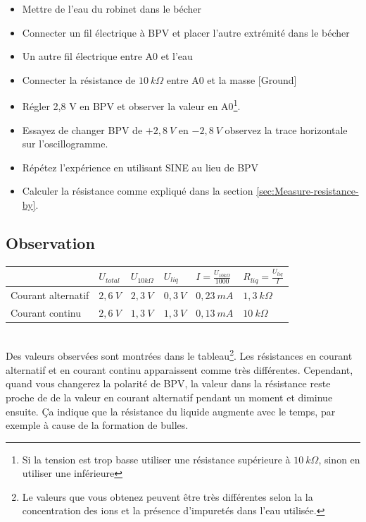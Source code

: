 \documentclass{book}
\begin{document}
\begin{itemize}
  \item Mettre de l'eau du robinet dans le bécher
  \item Connecter un fil électrique à BPV et placer l'autre extrémité dans le bécher
  \item Un autre fil électrique entre A0 et l'eau
  \item Connecter la résistance de $10\ k\Omega$  entre A0 et la masse [Ground]
  \item Régler 2,8 V en BPV et observer la valeur en A0\footnote{Si la tension est trop basse utiliser une résistance supérieure à $10\ k\Omega$, sinon en utiliser une inférieure}.
  \item Essayez de changer BPV de $+2,8\ V$ en $-2,8\ V$ observez la trace horizontale sur l'oscillogramme.
  \item Répétez l'expérience en utilisant SINE au lieu de BPV
  \item Calculer la résistance comme expliqué dans la section  \ref{sec:Measure-resistance-by}.
\end{itemize}

\subsection{Observation}


\begin{tabular}{|l|l|l|l|l|l|}
\hline

&$U_{total}$&$U_{10k\Omega}$&$U_{liq}$&$I=\frac{U_{10k\Omega} }{1000}$&$R_{liq}=\frac{U_{liq} }{I}$
\\ \hline
Courant alternatif&$2,6\ V$&$2,3\ V$&$0,3\ V$&$0,23\ mA$&$1,3\ k\Omega$
\\ \hline
Courant continu&$2,6\ V$&$1,3\ V$&$1,3\ V$&$0,13\ mA$&$10\ k\Omega$
\\ \hline
\end{tabular}\\[0.5em]
Des valeurs observées sont montrées dans le tableau\footnote{Le valeurs que vous obtenez peuvent être très différentes selon la la concentration des ions et la présence d'impuretés dans l'eau utilisée.}. Les résistances en courant alternatif et en courant continu apparaissent comme très différentes. Cependant, quand vous changerez la polarité de BPV, la valeur dans la résistance reste proche de de la valeur en courant alternatif pendant un moment et diminue ensuite. Ça indique que la résistance du liquide augmente avec le temps, par exemple à cause de la formation de bulles.
\end{document}
